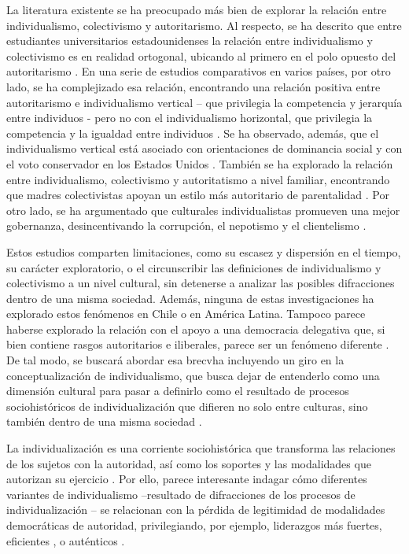\documentclass[12pt,twoside]{templates/facsothesis}
\begin{document}
La literatura existente se ha preocupado más bien de explorar la relación entre individualismo, colectivismo y autoritarismo. Al respecto, se ha descrito que entre estudiantes universitarios estadounidenses la relación entre individualismo y colectivismo es en realidad ortogonal, ubicando al primero en el polo opuesto del autoritarismo \citep{gelfand1996}. En una serie de estudios comparativos en varios países, por otro lado, se ha complejizado esa relación, encontrando una relación positiva entre autoritarismo e individualismo vertical -- que privilegia la competencia y jerarquía entre individuos - pero no con el individualismo horizontal, que privilegia la competencia y la igualdad entre individuos \citep{kemmelmeier2003}. Se ha observado, además, que el individualismo vertical está asociado con orientaciones de dominancia social \citep{strunk1999} y con el voto conservador en los Estados Unidos \citep{zhang2009}. También se ha explorado la relación entre individualismo, colectivismo y autoritatismo a nivel familiar, encontrando que madres colectivistas apoyan un estilo más autoritario de parentalidad \citep{rudy2006}. Por otro lado, se ha argumentado que culturales individualistas promueven una mejor gobernanza, desincentivando la corrupción, el nepotismo y el clientelismo \citep{kyriacou2016}.

Estos estudios comparten limitaciones, como su escasez y dispersión en el tiempo, su carácter exploratorio, o el circunscribir las definiciones de individualismo y colectivismo a un nivel cultural, sin detenerse a analizar las posibles difracciones dentro de una misma sociedad. Además, ninguna de estas investigaciones ha explorado estos fenómenos en Chile o en América Latina. Tampoco parece haberse explorado la relación con el apoyo a una democracia delegativa que, si bien contiene rasgos autoritarios e iliberales, parece ser un fenómeno diferente \citep{carlin2011, carlin2018}. De tal modo, se buscará abordar esa brecvha incluyendo un giro en la conceptualización de individualismo, que busca dejar de entenderlo como una dimensión cultural para pasar a definirlo como el resultado de procesos sociohistóricos de individualización que difieren no solo entre culturas, sino también dentro de una misma sociedad \citep{martuccelli2018, silvapalacios2015}.

La individualización es una corriente sociohistórica que transforma las relaciones de los sujetos con la autoridad, así como los soportes y las modalidades que autorizan su ejercicio \citep{araujo2021}. Por ello, parece interesante indagar cómo diferentes variantes de individualismo --resultado de difracciones de los procesos de individualización -- se relacionan con la pérdida de legitimidad de modalidades democráticas de autoridad, privilegiando, por ejemplo, liderazgos más fuertes, eficientes \citep{araujo2022, araujo2022a}, o auténticos \citep{gauthier2021}.
\end{document}
